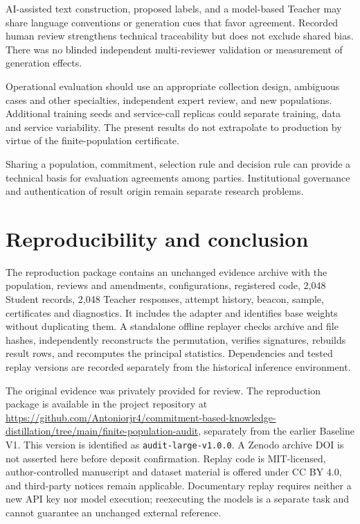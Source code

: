 \documentclass[
  10pt,
]{article}
\let\oldsection\section
\renewcommand{\section}{\needspace{5\baselineskip}\oldsection}
\begin{document}
AI-assisted text construction, proposed labels, and a model-based
Teacher may share language conventions or generation cues that favor
agreement. Recorded human review strengthens technical traceability but
does not exclude shared bias. There was no blinded independent
multi-reviewer validation or measurement of generation effects.

Operational evaluation should use an appropriate collection design,
ambiguous cases and other specialties, independent expert review, and
new populations. Additional training seeds and service-call replicas
could separate training, data and service variability. The present
results do not extrapolate to production by virtue of the
finite-population certificate.

Sharing a population, commitment, selection rule and decision rule can
provide a technical basis for evaluation agreements among parties.
Institutional governance and authentication of result origin remain
separate research problems.

\hypertarget{reproducibility-and-conclusion}{%
\section{Reproducibility and
conclusion}\label{reproducibility-and-conclusion}}

The reproduction package contains an unchanged evidence archive with the
population, reviews and amendments, configurations, registered code,
2,048 Student records, 2,048 Teacher responses, attempt history, beacon,
sample, certificates and diagnostics. It includes the adapter and
identifies base weights without duplicating them. A standalone offline
replayer checks archive and file hashes, independently reconstructs the
permutation, verifies signatures, rebuilds result rows, and recomputes
the principal statistics. Dependencies and tested replay versions are
recorded separately from the historical inference environment.

The original evidence was privately provided for review. The
reproduction package is available in the project repository at
\url{https://github.com/Antoniorjr4/commitment-based-knowledge-distillation/tree/main/finite-population-audit},
separately from the earlier Baseline V1. This version is identified as
\texttt{audit-large-v1.0.0}. A Zenodo archive DOI is not asserted here
before deposit confirmation. Replay code is MIT-licensed,
author-controlled manuscript and dataset material is offered under CC BY
4.0, and third-party notices remain applicable. Documentary replay
requires neither a new API key nor model execution; reexecuting the
models is a separate task and cannot guarantee an unchanged external
reference.
\end{document}

